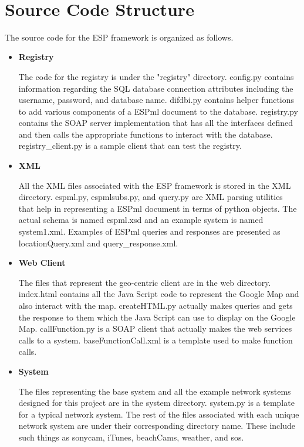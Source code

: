 \balancecolumns\newpage\ \\\newpage
\appendix
\section{Source Code Structure}


The source code for the ESP framework is organized as follows.

\begin{itemize}

\item \textbf{Registry}

The code for the registry is under the "registry" directory.  config.py contains information regarding the SQL database connection attributes including the username, password, and database
name.  difdbi.py contains helper functions to add various components of a ESPml document to the database.  registry.py contains the SOAP server implementation that has all the interfaces
defined and then calls the appropriate functions to interact with the database.  registry\_client.py is a sample client that can test the registry.

\item \textbf{XML}

All the XML files associated with the ESP framework is stored in the XML directory.  espml.py, espmlsubs.py, and query.py are XML parsing utilities that help in representing a ESPml
document in terms of python objects.  The actual schema is named espml.xsd and an example system is named system1.xml.  Examples of ESPml queries and responses are presented as
locationQuery.xml and query\_response.xml. 

\item \textbf{Web Client}

The files that represent the geo-centric client are in the web directory.  index.html contains all the Java Script code to represent the Google Map and also interact with the map.  createHTML.py
actually makes queries and gets the response to them which the Java Script can use to display on the Google Map.  callFunction.py is a SOAP client that actually makes the web services calls to 
a system.  baseFunctionCall.xml is a template used to make function calls.

\item \textbf{System}

The files representing the base system and all the example network systems designed for this project are in the system directory.  system.py is a template for a typical network system. 
The rest of the files associated with each unique network system are under their corresponding directory name.  These include such things as sonycam, iTunes, beachCams, weather, and sos.

\end{itemize}

